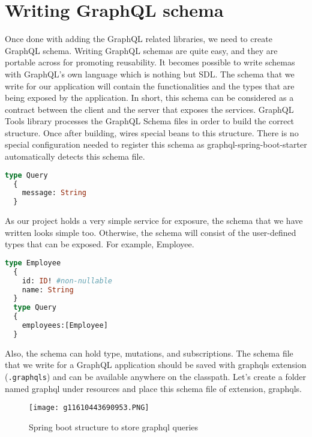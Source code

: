 \documentclass[../main.tex]{subfiles}
\begin{document}
\section{Writing GraphQL schema}
Once done with adding the GraphQL related libraries, we need to create GraphQL schema. Writing GraphQL schemas are quite easy, and they are portable across for promoting reusability. It becomes possible to write schemas with GraphQL’s own language which is nothing but \gls{SDL}.
The schema that we write for our application will contain the functionalities and the types that are being exposed by the application. In short, this schema can be considered as a contract between the client and the server that exposes the services.
GraphQL Tools library processes the GraphQL Schema files in order to build the correct structure. Once after building, wires special beans to this structure. There is no special configuration needed to register this schema as graphql-spring-boot-starter automatically detects this schema file.
\begin{lstlisting}[language=GraphQL, caption={Sample SDL}, label={lst:sample-sdl}]
  type Query 
  {
    message: String
  }
\end{lstlisting}
As our project holds a very simple service for exposure, the schema that we have written looks simple too. Otherwise, the schema will consist of the user-defined types that can be exposed. For example, Employee.
\begin{lstlisting}[language=GraphQL, caption={Employee SDL schema}, label={lst:employee-sdl-schema}]
  type Employee
  {
    id: ID! #non-nullable
    name: String
  }
  type Query
  {
    employees:[Employee]
  }
\end{lstlisting}
Also, the schema can hold type, mutations, and subscriptions.
The schema file that we write for a GraphQL application should be saved with graphqls extension (\lstinline{.graphqls}) and can be available anywhere on the classpath.
Let's create a folder named graphql under resources and place this schema file of extension, graphqls.

\begin{figure}[h!]
  \centerline{\texttt{[image: g11610443690953.PNG]}}
  \caption{Spring boot structure to store graphql queries}
  \label{fig:Spring-boot-structure-to-store-graphql-queries}
\end{figure}
\end{document}
